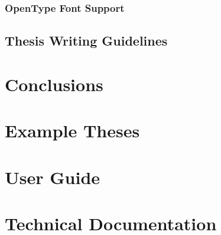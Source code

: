       \subsection{OpenType Font Support} 
      \blindtext

    \section{Thesis Writing Guidelines} 
    \blindtext

  \chapter{Conclusions} 
    \blindtext

  \newpage
  {\footnotesize
  \singlespacing
  \nocite{*}
  }

  \newpage
  \printglossaries

  \printindex

  \begin{appendices}

    \chapter{Example Theses} 
      \blindtext

    \chapter{User Guide} 
      \blindtext

    \chapter{Technical Documentation} 
      \blindtext

  \end{appendices}


